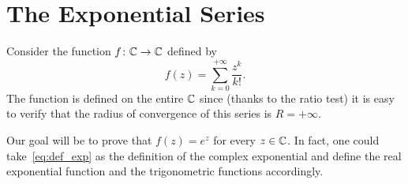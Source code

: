 \section{The Exponential Series}

Consider the function $f \colon {\mathbb C} \to {\mathbb C}$
defined by 
\begin{equation}\label{eq:def_exp}
f(z) = \sum_{k=0}^{+\infty} \frac{z^k}{k!}.
\end{equation}
The function is defined on the entire ${\mathbb C}$ since (thanks to the ratio test)
it is easy to verify that the radius of convergence of this series is
$R=+\infty$.

Our goal will be to prove that $f(z)=e^z$ for every $z\in {\mathbb C}$.
In fact, one could take~\ref{eq:def_exp} as the definition 
of the complex exponential and define the real exponential 
function and the trigonometric functions accordingly.

